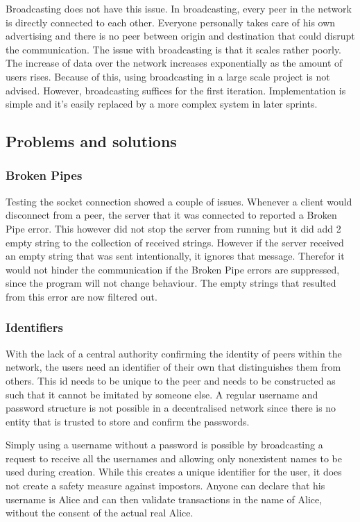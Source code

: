 \documentclass[]{article}
\begin{document}
Broadcasting does not have this issue.
In broadcasting, every peer in the network is directly connected to each other.
Everyone personally takes care of his own advertising and there is no peer between origin and destination that could disrupt the communication.
The issue with broadcasting is that it scales rather poorly.
The increase of data over the network increases exponentially as the amount of users rises.
Because of this, using broadcasting in a large scale project is not advised.
However, broadcasting suffices for the first iteration.
Implementation is simple and it's easily replaced by a more complex system in later sprints.




\subsection{Problems and solutions}
\subsubsection{Broken Pipes}
Testing the socket connection showed a couple of issues.
Whenever a client would disconnect from a peer, the server that it was connected to reported a Broken Pipe error.
This however did not stop the server from running but it did add 2 empty string to the collection of received strings.
However if the server received an empty string that was sent intentionally, it ignores that message.
Therefor it would not hinder the communication if the Broken Pipe errors are suppressed, since the program will not change behaviour.
The empty strings that resulted from this error are now filtered out.

\subsubsection{Identifiers}
With the lack of a central authority confirming the identity of peers within the network, the users need an identifier of their own that distinguishes them from others.
This id needs to be unique to the peer and needs to be constructed as such that it cannot be imitated by someone else.
A regular username and password structure is not possible in a decentralised network since there is no entity that is trusted to store and confirm the passwords.


Simply using a username without a password is possible by broadcasting a request to receive all the usernames and allowing only nonexistent names to be used during creation.
While this creates a unique identifier for the user, it does not create a safety measure against impostors.
Anyone can declare that his username is Alice and can then validate transactions in the name of Alice, without the consent of the actual real Alice.
\end{document}
